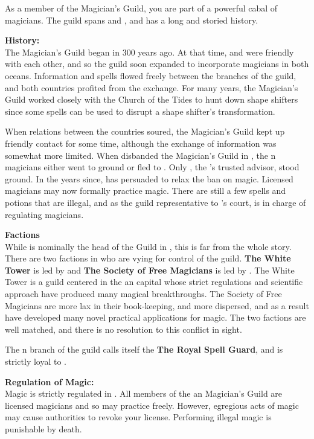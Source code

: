 \documentclass[blue]{NeptuneBall}
\begin{document}
\name{\bMagician{}}

As a member of the Magician's Guild, you are part of a powerful cabal of magicians. The guild spans \pAtlantis{} and \pPacifica{}, and has a long and storied history.

{\bf History:}\\
The Magician's Guild began in \pAtlantis{} 300 years ago. At that time, \pAtlantis{} and \pPacifica{} were friendly with each other, and so the guild soon expanded to incorporate magicians in both oceans. Information and spells flowed freely between the branches of the guild, and both countries profited from the exchange. For many years, the Magician's Guild worked closely with the Church of the Tides to hunt down shape shifters since some spells can be used to disrupt a shape shifter's transformation.

When relations between the countries soured, the Magician's Guild kept up friendly contact for some time, although the exchange of information was somewhat more limited. When \cKing{\King} \cKing{} disbanded the Magician's Guild in \pAtlantis{}, the \pAtlantis{}n magicians either went to ground or fled to \pPacifica{}. Only \cManta{}, the \cKing{\King}'s trusted advisor, stood \cManta{\their} ground. In the years since, \cManta{} has persuaded \cKing{} to relax the ban on magic. Licensed magicians may now formally practice magic. There are still a few spells and potions that are illegal, and as the guild representative to \cKing{\King} \cKing{}'s court, \cManta{} is in charge of regulating magicians.

{\bf Factions}\\
While \cManta{} is nominally the head of the Guild in \pAtlantis{}, this is far from the whole story. There are two factions in \pAtlantis{} who are vying for control of the guild. {\bf The White Tower} is led by \cManta{} and {\bf The Society of Free Magicians} is led by \cWitch{\MYname}. The White Tower is a guild centered in the \pAtlantis{}an capital whose strict regulations and scientific approach have produced many magical breakthroughs. The Society of Free Magicians are more lax in their book-keeping, and more dispersed, and as a result have developed many novel practical applications for magic. The two factions are well matched, and there is no resolution to this conflict in sight.

The \pPacifica{}n branch of the guild calls itself the {\bf The Royal Spell Guard}, and is strictly loyal to \pPacifica{}.

{\bf Regulation of Magic:}\\
Magic is strictly regulated in \pAtlantis{}. All members of the \pAtlantis{}an Magician's Guild are licensed magicians and so may practice freely. However, egregious acts of magic may cause authorities to revoke your license. Performing illegal magic is punishable by death.
\end{document}

